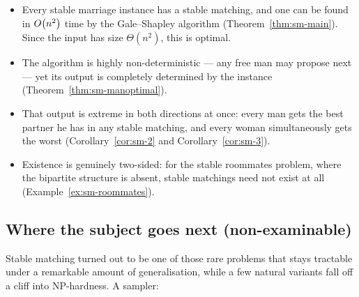 \begin{itemize}
  \item Every stable marriage instance has a stable matching, and one can be
        found in $O\!\left(n^2\right)$ time by the Gale--Shapley algorithm
        (Theorem~\ref{thm:sm-main}). Since the input has size $\Theta(n^2)$, this
        is optimal.
  \item The algorithm is highly non-deterministic --- any free man may propose
        next --- yet its output is completely determined by the instance
        (Theorem~\ref{thm:sm-manoptimal}).
  \item That output is extreme in both directions at once: every man gets the
        best partner he has in any stable matching, and every woman
        simultaneously gets the worst (Corollary~\ref{cor:sm-2} and
        Corollary~\ref{cor:sm-3}).
  \item Existence is genuinely two-sided: for the stable roommates problem,
        where the bipartite structure is absent, stable matchings need not
        exist at all (Example~\ref{ex:sm-roommates}).
\end{itemize}

\subsection*{Where the subject goes next (non-examinable)}

Stable matching turned out to be one of those rare problems that stays
tractable under a remarkable amount of generalisation, while a few natural
variants fall off a cliff into NP-hardness. A sampler:

